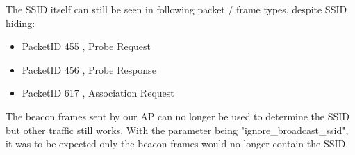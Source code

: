 The SSID itself can still be seen in following packet / frame types, despite SSID hiding:
\begin{itemize}
\item PacketID 455  , Probe Request
\item PacketID 456  , Probe Response
\item PacketID 617  , Association Request
\end{itemize}
The beacon frames sent by our AP can no longer be used to determine the SSID but other traffic still works.
With the parameter being "ignore_broadcast_ssid", it was to be expected only the beacon frames would no longer contain the SSID.
